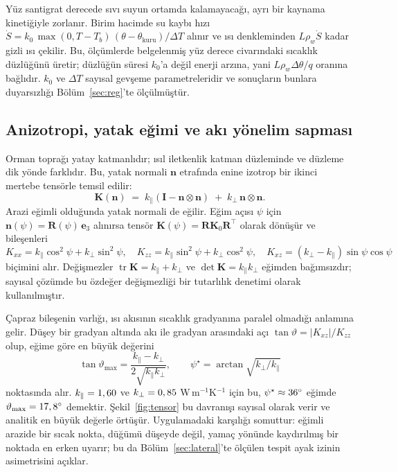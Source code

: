 \documentclass[11pt,a4paper]{article}
\newcommand{\bK}{\mathbf{K}}
\newcommand{\bn}{\mathbf{n}}
\begin{document}
Yüz santigrat derecede sıvı suyun ortamda kalamayacağı, ayrı bir kaynama
kinetiğiyle zorlanır. Birim hacimde su kaybı hızı
$\dot S = k_0\,\max(0,T-T_b)\,(\theta-\theta_{\mathrm{kuru}})/\Delta T$ alınır
ve ısı denkleminden $L\rho_w \dot S$ kadar gizli ısı çekilir. Bu, ölçümlerde
belgelenmiş yüz derece civarındaki sıcaklık düzlüğünü üretir; düzlüğün süresi
$k_0$'a değil enerji arzına, yani $L\rho_w \Delta\theta / q$ oranına bağlıdır.
$k_0$ ve $\Delta T$ sayısal gevşeme parametreleridir ve sonuçların bunlara
duyarsızlığı Bölüm~\ref{sec:reg}'te ölçülmüştür.

\subsection{Anizotropi, yatak eğimi ve akı yönelim sapması}

Orman toprağı yatay katmanlıdır; ısıl iletkenlik katman düzleminde ve düzleme
dik yönde farklıdır. Bu, yatak normali $\bn$ etrafında enine izotrop bir
ikinci mertebe tensörle temsil edilir:
\begin{equation}
\bK(\bn) \;=\; k_\parallel\left(\mathbf{I}-\bn\otimes\bn\right)
              \;+\; k_\perp\,\bn\otimes\bn .
\label{eq:Ktensor}
\end{equation}
Arazi eğimli olduğunda yatak normali de eğilir. Eğim açısı $\psi$ için
$\bn(\psi) = \mathbf{R}(\psi)\,\mathbf{e}_3$ alınırsa tensör
$\bK(\psi) = \mathbf{R}\bK_0\mathbf{R}^{\!\top}$ olarak dönüşür ve bileşenleri
\begin{equation}
K_{xx} = k_\parallel\cos^2\!\psi + k_\perp\sin^2\!\psi,\quad
K_{zz} = k_\parallel\sin^2\!\psi + k_\perp\cos^2\!\psi,\quad
K_{xz} = (k_\perp-k_\parallel)\sin\psi\cos\psi
\end{equation}
biçimini alır. Değişmezler $\operatorname{tr}\bK = k_\parallel+k_\perp$ ve
$\det\bK = k_\parallel k_\perp$ eğimden bağımsızdır; sayısal çözümde bu
özdeğer değişmezliği bir tutarlılık denetimi olarak kullanılmıştır.

Çapraz bileşenin varlığı, ısı akısının sıcaklık gradyanına paralel olmadığı
anlamına gelir. Düşey bir gradyan altında akı ile gradyan arasındaki açı
$\tan\vartheta = |K_{xz}|/K_{zz}$ olup, eğime göre en büyük değerini
\begin{equation}
\tan\vartheta_{\max} = \frac{k_\parallel-k_\perp}{2\sqrt{k_\parallel k_\perp}},
\qquad
\psi^\star = \arctan\sqrt{k_\perp/k_\parallel}
\end{equation}
noktasında alır. $k_\parallel = 1,60$ ve $k_\perp = 0,85$
W\,m$^{-1}$K$^{-1}$ için bu, $\psi^\star \approx 36^\circ$ eğimde
$\vartheta_{\max} = 17,8^\circ$ demektir. Şekil~\ref{fig:tensor} bu
davranışı sayısal olarak verir ve analitik en büyük değerle örtüşür.
Uygulamadaki karşılığı somuttur: eğimli arazide bir sıcak nokta, düğümü
düşeyde değil, yamaç yönünde kaydırılmış bir noktada en erken uyarır; bu da
Bölüm~\ref{sec:lateral}'te ölçülen tespit ayak izinin asimetrisini açıklar.
\end{document}

